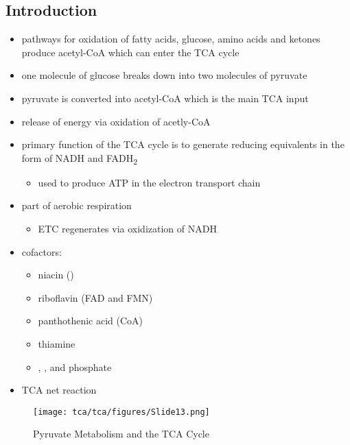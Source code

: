 \documentclass{scrartcl}
\begin{document}
\subsection{Introduction}
\label{sec:orgb2f2bc9}
\begin{itemize}
\item pathways for oxidation of fatty acids, glucose, amino acids and
ketones produce acetyl-CoA which can enter the TCA cycle
\item one molecule of glucose breaks down into two molecules of pyruvate
\item pyruvate is converted into acetyl-CoA which is the main TCA input
\item release of energy via oxidation of acetly-CoA
\item primary function of the TCA cycle is to generate reducing
equivalents in the form of NADH and FADH\textsubscript{2}
\begin{itemize}
\item used to produce ATP in the electron transport chain
\end{itemize}
\end{itemize}

\centering
{}
\begin{itemize}
\item part of aerobic respiration
\begin{itemize}
\item ETC regenerates  via oxidization of NADH
\end{itemize}
\item cofactors:
\begin{itemize}
\item niacin ()
\item riboflavin (FAD and FMN)
\item panthothenic acid (CoA)
\item thiamine
\item {}, ,  and phosphate
\end{itemize}
\item TCA net reaction
\end{itemize}

{\tiny{}}

\begin{figure}[htbp]
\centering
\texttt{[image: tca/tca/figures/Slide13.png]}
\caption[TCA]{\label{fig:org1ecbac1}Pyruvate Metabolism and the TCA Cycle}
\end{figure}
\end{document}
